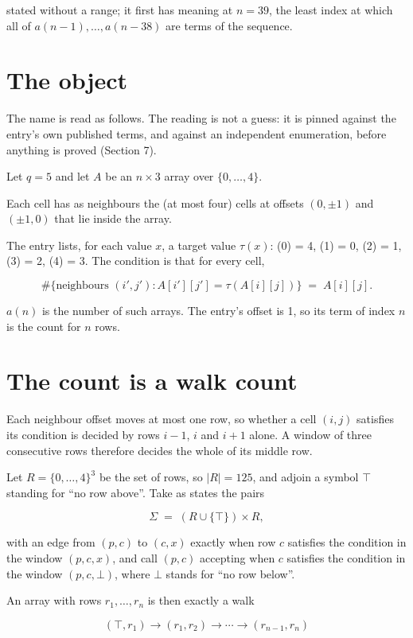 \documentclass[11pt]{article}
\theoremstyle{definition}
\begin{document}
stated without a range; it first has meaning at $n = 39$, the least index at which all of $a(n-1),\dots,a(n-38)$ are terms of the sequence.

\section{The object}

The name is read as follows. The reading is not a guess: it is pinned against the entry's own published terms, and against an independent enumeration, before anything is proved (Section 7).

Let $q = 5$ and let $A$ be an $n \times 3$ array over $\{0,\dots,4\}$.

Each cell has as neighbours the (at most four) cells at offsets $(0,\pm1)$ and $(\pm1,0)$ that lie inside the array.

The entry lists, for each value $x$, a target value $\tau(x)$: \tau(0) = 4, \tau(1) = 0, \tau(2) = 1, \tau(3) = 2, \tau(4) = 3. The condition is that for every cell,

\[\#\{\text{neighbours } (i',j') : A[i'][j'] = \tau(A[i][j])\} \;=\; A[i][j].\]

$a(n)$ is the number of such arrays. The entry's offset is 1, so its term of index $n$ is the count for $n$ rows.

\section{The count is a walk count}

Each neighbour offset moves at most one row, so whether a cell $(i,j)$ satisfies its condition is decided by rows $i-1$, $i$ and $i+1$ alone. A window of three consecutive rows therefore decides the whole of its middle row.

Let $R = \{0,\dots,4\}^{3}$ be the set of rows, so $|R| = 125$, and adjoin a symbol $\top$ standing for ``no row above''. Take as states the pairs

\[\Sigma \;=\; (R \cup \{\top\}) \times R,\]

with an edge from $(p,c)$ to $(c,x)$ exactly when row $c$ satisfies the condition in the window $(p,c,x)$, and call $(p,c)$ accepting when $c$ satisfies the condition in the window $(p,c,\bot)$, where $\bot$ stands for ``no row below''.

An array with rows $r_1,\dots,r_n$ is then exactly a walk

\[(\top,r_1) \to (r_1,r_2) \to \cdots \to (r_{n-1},r_n)\]
\end{document}
